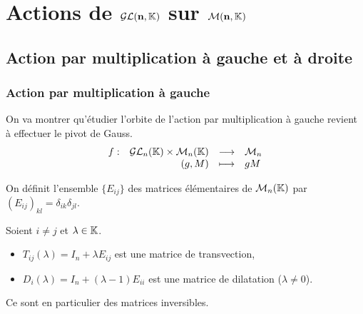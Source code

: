 \section{Actions de $\mathbf{\mathcal{GL}(n,\mathbb{K})}$ sur $\mathbf{\mathcal{M}(n,\mathbb{K})}$}
\vspace{0.5em}

\subsection[Action par multiplication]{Action par multiplication à gauche et à
droite}
\vspace{0.5em}

\subsubsection{Action par multiplication à gauche}
\vspace{0.5em}

On va montrer qu'étudier l'orbite de l'action par multiplication à gauche
revient à effectuer le pivot de Gauss.
\begin{displaymath}
 \begin{array}{rrcl}
     f :&   \mathcal{GL}_n(\mathbb{K}) \times \mathcal{M}_n(\mathbb{K}) & \longrightarrow & \mathcal{M}_n \\
        &(g,M)& \longmapsto & gM
       \end{array}
\end{displaymath}

On définit l'ensemble $\{E_{ij}\}$ des matrices élémentaires de $\mathcal{M}_n(\mathbb{K})$ par
$(E_{ij})_{kl} = \delta_{ik} \delta_{jl} $.

\begin{defi}

 Soient $i\neq j$ et $\lambda \in \mathbb{K}$.
\begin{itemize}
 \item $T_{ij}(\lambda) = I_n + \lambda E_{ij}$ est une matrice de transvection,
 \item $D_i(\lambda) = I_n + (\lambda -1)E_{ii}$ est une matrice de dilatation
($\lambda \neq 0$).
\end{itemize}

Ce sont en particulier des matrices inversibles.
\end{defi}

